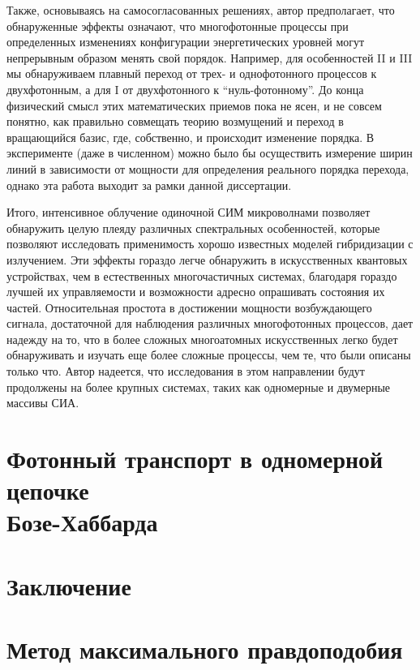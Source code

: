 \documentclass[14pt, a4paper]{extreport}
\renewcommand*\thesection{\arabic{section}}
\numberwithin{equation}{section}
\renewcommand*\thesection{\arabic{chapter}.\arabic{section}}
\begin{document}
Также, основываясь на самосогласованных решениях, автор предполагает, что обнаруженные эффекты означают, что многофотонные процессы при определенных изменениях конфигурации энергетических уровней могут непрерывным образом менять свой порядок. Например, для особенностей II и III мы обнаруживаем плавный переход от трех- и однофотонного процессов к двухфотонным, а для I от двухфотонного к ``нуль-фотонному''. До конца физический смысл этих математических приемов пока не ясен, и не совсем понятно, как правильно совмещать теорию возмущений и переход в вращающийся базис, где, собственно, и происходит изменение порядка. В эксперименте (даже в численном) можно было бы осуществить измерение ширин линий в зависимости от мощности для определения реального порядка перехода, однако эта работа выходит за рамки данной диссертации.

Итого, интенсивное облучение одиночной СИМ микроволнами позволяет обнаружить целую плеяду различных спектральных особенностей, которые позволяют исследовать применимость хорошо известных моделей гибридизации с излучением. Эти эффекты гораздо легче обнаружить в искусственных квантовых устройствах, чем в естественных многочастичных системах, благодаря гораздо лучшей их управляемости и возможности адресно опрашивать состояния их частей. Относительная простота в достижении мощности возбуждающего сигнала, достаточной для наблюдения различных многофотонных процессов, дает надежду на то, что в более сложных многоатомных искусственных легко будет обнаруживать и изучать еще более сложные процессы, чем те, что были описаны только что. Автор надеется, что исследования в этом направлении будут продолжены на более крупных системах, таких как одномерные и двумерные массивы СИА.

\chapter{Фотонный транспорт в одномерной цепочке\\ Бозе-Хаббарда}

\chapter{Заключение}



\appendix
\renewcommand*\thesection{\Alph{chapter}.\arabic{section}}

\chapter{Метод максимального правдоподобия}\label{sec:MLE}
\end{document}
